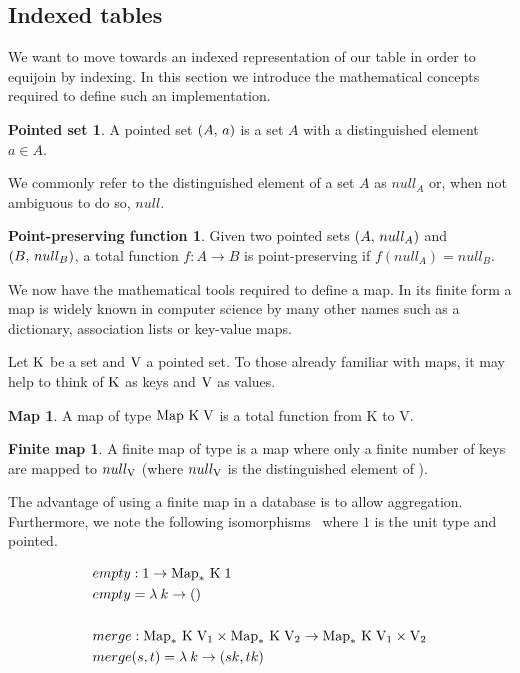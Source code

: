 \subsection{Indexed tables}
We want to move towards an indexed representation of our table in order to
equijoin by indexing. In this section we introduce the mathematical concepts required to define such an implementation.
\theoremstyle{definition}\newtheorem*{psetdef}{Pointed set}
\theoremstyle{definition}\newtheorem*{ppfuncdef}{Point-preserving function}
\theoremstyle{definition}\newtheorem*{mapdef}{Map}
\theoremstyle{definition}\newtheorem*{finitemapdef}{Finite map}
\theoremstyle{definition}\newtheorem*{indexedtabledef}{Indexed Table}
\begin{psetdef}\label{def:pset}
  A pointed set $\left(A,\,a\right)$ is a set $A$ with a distinguished element $a \in A$.
\end{psetdef}
We commonly refer to the distinguished element of a set $A$ as $null_A$ or, when not ambiguous to do so, $null$.
\begin{ppfuncdef}\label{def:ppfunc}
  Given two pointed sets $\left(A,\,null_A\right)$ and $\left(B,\,null_B\right)$, a total function $f: A \rightarrow B$ is point-preserving if $f(null_A) = null_B$.
\end{ppfuncdef}

We now have the mathematical tools required to define a map. In its finite form a map is widely known in computer science by many other names such as a dictionary, association lists or key-value maps.

Let $\mathrm{K}$ be a set and $\mathrm{V}$ a pointed set. To those already familiar with maps, it may help to think of $\mathrm{K}$ as keys and $\mathrm{V}$ as values.
\begin{mapdef}
  A map of type $\mathrm{Map}\ \mathrm{K}\;\mathrm{V}$ is a total function from K to V.
\end{mapdef}
\begin{finitemapdef}
  A finite map of type \finitemap{\keyset}{\valset} is a map where only a finite number of keys are mapped to $null_{\mathrm{V}}$ (where $null_{\mathrm{V}}$ is the distinguished element of \valset). 
\end{finitemapdef}
The advantage of using a finite map in a database is to allow aggregation.
Furthermore, we note the following
isomorphisms~\cite{RelationalAlgebraByWayOfAdjunctions} where $1$ is the unit
type and pointed.

\begin{equation*}
\begin{split}
    & empty: 1 \rightarrow \mathrm{Map}_*\ \mathrm{K}\;1 \\
    & empty = \lambda\:k \rightarrow () \\
    \\
    & merge: \mathrm{Map}_*\ \mathrm{K}\;\mathrm{V}_1 \times \mathrm{Map}_*\ \mathrm{K}\;\mathrm{V}_2
             \rightarrow \mathrm{Map}_*\ \mathrm{K}\;\mathrm{V}_1 \times \mathrm{V}_2 \\
    & merge (s, t) = \lambda\:k \rightarrow (s k, t k) \\
\end{split}
\end{equation*}

